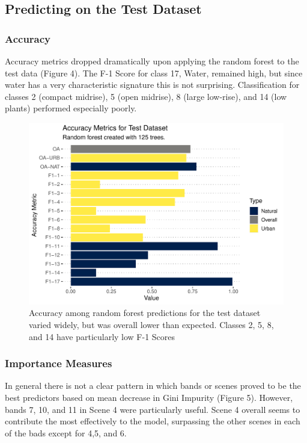 \documentclass[
]{article}
\begin{document}
\hypertarget{predicting-on-the-test-dataset}{%
\subsection{Predicting on the Test
Dataset}\label{predicting-on-the-test-dataset}}

\hypertarget{accuracy}{%
\subsubsection{Accuracy}\label{accuracy}}

Accuracy metrics dropped dramatically upon applying the random forest to
the test data (Figure 4). The F-1 Score for class 17, Water, remained
high, but since water has a very characteristic signature this is not
surprising. Classification for classes 2 (compact midrise), 5 (open
midrise), 8 (large low-rise), and 14 (low plants) performed especially
poorly.

\begin{figure}[H]

{\centering \includegraphics[width=0.75\linewidth]{../results/plots/test_set_accuracy_metrics_barplot} 

}

\caption{Accuracy among random forest predictions for the test dataset varied widely, but was overall lower than expected. Classes 2, 5, 8, and 14 have particularly low F-1 Scores}\label{fig:image-ref-for-in-text4}
\end{figure}

\hypertarget{importance-measures}{%
\subsubsection{Importance Measures}\label{importance-measures}}

In general there is not a clear pattern in which bands or scenes proved
to be the best predictors based on mean decrease in Gini Impurity
(Figure 5). However, bands 7, 10, and 11 in Scene 4 were particularly
useful. Scene 4 overall seems to contribute the most effectively to the
model, surpassing the other scenes in each of the bads except for 4,5,
and 6.
\end{document}
